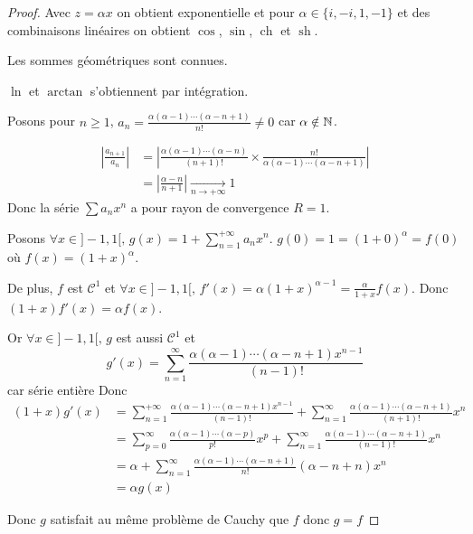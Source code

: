 \begin{proof}
    Avec $z = \alpha x$ on obtient exponentielle et pour $\alpha \in \{i, -i, 1, -1\}$ et des combinaisons linéaires on obtient 
    $\cos$, $\sin$, $\operatorname{ch}$ et $\operatorname{sh}$.

    Les sommes géométriques sont connues. 

    $\ln$ et $\arctan$ s'obtiennent par intégration. 

    Posons pour $n \geqslant 1$, $a_n = \frac{\alpha (\alpha - 1) \cdots (\alpha - n + 1)}{n!} \neq 0$ 
    car $\alpha \notin \mathbb{N}$.  

    \begin{align}
        \left| \frac{a_{n + 1}}{a_n} \right| & = \left| \frac{\alpha (\alpha - 1) \cdots (\alpha - n)}{(n + 1)!} \times \frac{n!}{\alpha (\alpha - 1) \cdots (\alpha - n + 1)} \right| \\
        & = \left| \frac{\alpha - n }{n + 1} \right| \xrightarrow[n \to + \infty]{} 1
    \end{align}
    Donc la série $\sum a_n x^n$ a pour rayon de convergence $R = 1$.

    Posons $\displaystyle \forall x \in ]-1, 1[, \, g(x) = 1 + \sum_{n = 1}^{+\infty} a_n x^n$. 
    $g(0) = 1 = (1 + 0)^\alpha = f(0)$ où $f(x) = (1 + x)^\alpha$. 

    De plus, $f$ est $\mathscr C^1$ et $\forall x \in ]-1, 1[, \, f'(x) = \alpha (1 + x)^{\alpha - 1} = \frac \alpha {1 + x} f(x)$.
    Donc $(1 + x) f'(x) = \alpha f(x)$. 

    Or $\forall x \in ]-1, 1[, \, g$ est aussi $\mathscr C^1$ et
    $$ g'(x) = \sum_{n = 1 }^{\infty   } \frac{\alpha (\alpha - 1) \cdots (\alpha - n + 1) x^{n - 1}}{(n - 1 )! }$$ car série entière 
    Donc 
    \begin{align}
        (1 + x) g'(x) & = \displaystyle \sum_{n = 1 }^{+ \infty   } \frac{\alpha (\alpha - 1) \cdots (\alpha - n + 1) x^{n - 1}}{(n - 1)!} + \sum_{n = 1 }^{\infty   } \frac{\alpha (\alpha - 1) \cdots (\alpha - n + 1) }{(n + 1)!} x^n \\
        & = \sum_{p = 0 }^{\infty    } \frac{\alpha (\alpha - 1) \cdots (\alpha - p)}{p!} x^p + \sum_{n = 1 }^{\infty   } \frac{\alpha (\alpha - 1) \cdots (\alpha - n + 1)}{(n - 1)!} x^n \\
        & = \alpha + \sum_{n = 1 }^{\infty   } \frac{\alpha (\alpha - 1) \cdots (\alpha - n + 1)}{n! } (\alpha - n + n) x^n \\
        & = \alpha g(x)
    \end{align}

    Donc $g$ satisfait au même problème de Cauchy que $f$ donc $g = f$ 
\end{proof}